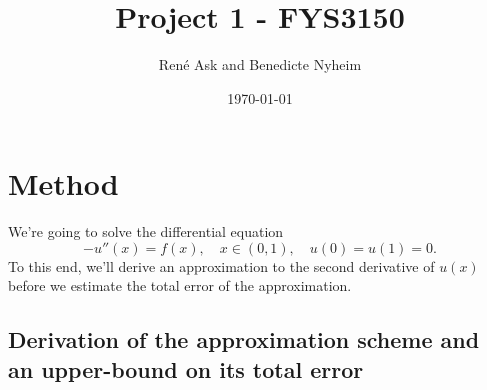 \documentclass[english,notitlepage]{revtex4-1}  %
\begin{document}
\title{Project 1 - FYS3150}      %
\author{René Ask and Benedicte Nyheim}          %
\date{\today}                             %
\noaffiliation                            %
\maketitle                                %

\section{Method}
We're going to solve the differential equation 
\begin{equation}\label{diff_eq}
	-u''(x) = f(x), \quad x \in (0,1), \quad u(0)=u(1)=0.
\end{equation}
To this end, we'll derive an approximation to the second derivative of $u(x)$ before we estimate the total error of the approximation. 
\subsection{Derivation of the approximation scheme and an upper-bound on its total error}
\end{document}

